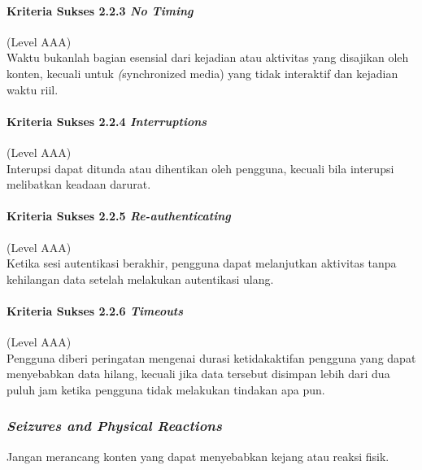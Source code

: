 \documentclass[a4paper,twoside]{article}
\begin{document}
\begin{enumerate}
		\paragraph{Kriteria Sukses 2.2.3 \textit{No Timing}}
		\label{sec:kriteria_sukses_2.2.3}
		(Level AAA)\\

		Waktu bukanlah bagian esensial dari kejadian atau aktivitas yang disajikan oleh konten, kecuali untuk \textit(synchronized media) yang tidak interaktif dan kejadian waktu riil.

		\paragraph{Kriteria Sukses 2.2.4 \textit{Interruptions}}
		\label{sec:kriteria_sukses_2.2.4}
		(Level AAA)\\

		Interupsi dapat ditunda atau dihentikan oleh pengguna, kecuali bila interupsi melibatkan keadaan darurat.

		\paragraph{Kriteria Sukses 2.2.5 \textit{Re-authenticating}}
		\label{sec:kriteria_sukses_2.2.5}
		(Level AAA)\\

		Ketika sesi autentikasi berakhir, pengguna dapat melanjutkan aktivitas tanpa kehilangan data setelah melakukan autentikasi ulang.

		\paragraph{Kriteria Sukses 2.2.6 \textit{Timeouts}}
		\label{sec:kriteria_sukses_2.2.6}
		(Level AAA)\\

		Pengguna diberi peringatan mengenai durasi ketidakaktifan pengguna yang dapat menyebabkan data hilang, kecuali jika data tersebut disimpan lebih dari dua puluh jam ketika pengguna tidak melakukan tindakan apa pun.

		\subsubsection*{\textit{Seizures and Physical Reactions}}
		\label{sec:seizures_and_physical_reactions}
		Jangan merancang konten yang dapat menyebabkan kejang atau reaksi fisik.


\end{enumerate}
\end{document}
